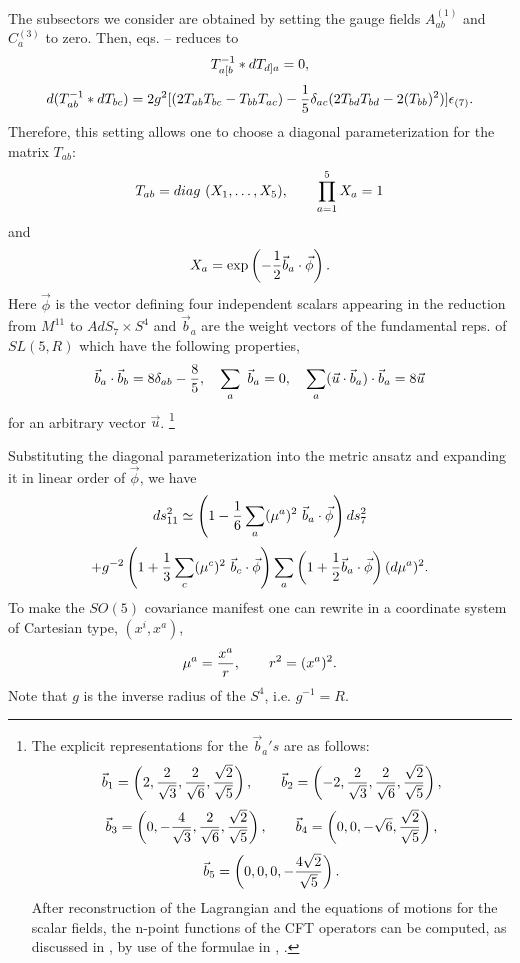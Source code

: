 \documentclass[a4paper,11pt]{article}
\begin{document}
The subsectors we consider are obtained by setting
the gauge fields $A^{(1)}_{ab}$ and $C^{(3)}_{a}$ to zero. Then,
eqs.  --  reduces to
\begin{equation}\plabel{emF2r}
T^{-1}_{a[b}\ast dT_{d]a}=0,
\end{equation}
\begin{equation}\plabel{emTr}
d(T^{-1}_{ab}\ast dT_{bc})=2g^2
[(2T_{ab}T_{bc}-T_{bb}T_{ac})-{1\over 5}\d_{ac}
(2T_{bd}T_{bd}-2(T_{bb})^2)]\e_{(7)}.
\end{equation}
Therefore, this
setting allows one to choose a diagonal parameterization \cite{pope}
for the matrix $T_{ab}$:
\begin{equation}\plabel{Trep}
T_{ab}=diag~ (X_1,\dots,X_5),\qquad \prod_{a=1}^{5} X_a =1
\end{equation}
and
\begin{equation}\plabel{Xrep}
X_a=\exp \left( -{1\over 2}\vec{b}_a \cdot \vec{\phi} \right).
\end{equation}
Here $\vec{\phi}$ is the vector defining four independent scalars
appearing in the reduction from $M^{11}$ to $AdS_7\times S^4$ and
$\vec{b}_a$ are the weight vectors of the fundamental reps. of
$SL(5,R)$ which have the following properties,
\begin{equation}\plabel{bprop}
\vec{b}_a\cdot \vec{b}_b=8\d_{ab}-{8\over 5},\ \ \
\sum_a~\vec{b}_a=0,\ \ \ \sum_a (\vec{u}\cdot \vec{b}_a)\cdot\vec{b}_a=
8\vec{u}
\end{equation}
for an arbitrary vector $\vec{u}$. \footnote{The explicit
representations for the $\vec{b}_a's$  are as follows:
$$
\vec{b}_1=\left( 2,{2\over \sqrt{3}},{2\over \sqrt{6}},
{\sqrt{2}\over \sqrt{5}}\right),\qquad
\vec{b}_2=\left( -2,{2\over \sqrt{3}},{2\over \sqrt{6}},
{\sqrt{2}\over \sqrt{5}}\right),
$$
$$
\vec{b}_3=\left( 0,-{4\over \sqrt{3}},{2\over \sqrt{6}},
{\sqrt{2}\over \sqrt{5}}\right),\qquad \vec{b}_4=\left(
0,0,-\sqrt{6}, {\sqrt{2}\over \sqrt{5}}\right),
$$
$$
\vec{b}_5=\left( 0,0,0,-{4\sqrt{2}\over \sqrt{5}}\right).
$$
After reconstruction of the Lagrangian and the equations of
motions for the scalar fields, the n-point functions of the CFT
operators can be computed, as discussed in \cite{tran}, by use of
the formulae in \cite{fmmr}, \cite{mv}.}

Substituting the diagonal parameterization  into the
metric ansatz  and expanding it in linear order of
$\vec{\phi}$, we have
$$
ds^2_{11} \simeq \left(1-{1\over 6}\sum_a (\mu^a)^2~\vec{b}_a\cdot
\vec{\phi} \right) ds^2_7
$$
\begin{equation}\plabel{ansexp}
+g^{-2}\left( 1+{1\over 3}\sum_c (\m^c)^2~\vec{b}_c \cdot \vec{\phi}\right)
\sum_a \left(1+{1\over 2}\vec{b}_a\cdot \vec{\phi}\right)(d\m^a)^2.
\end{equation}
To make the $SO(5)$ covariance manifest one can rewrite  in
a coordinate system of Cartesian type, $(x^i,x^a)$,
\begin{equation}\plabel{cart}
\mu^a={x^a\over r}, \qquad r^2=(x^a)^2.
\end{equation}
Note that $g$ is the inverse radius of the $S^4$, i.e. $g^{-1}=R$.
\end{document}
